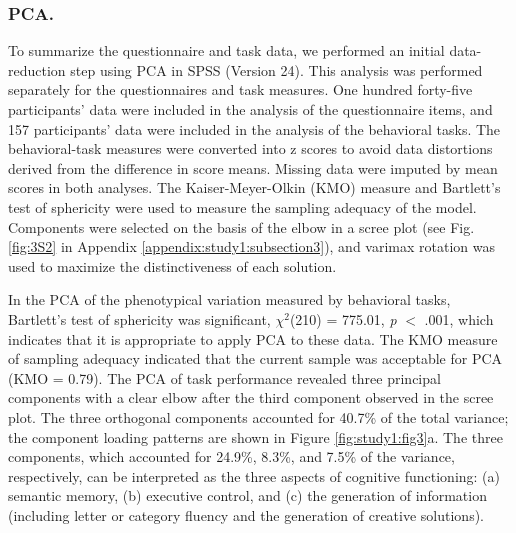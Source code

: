\subsubsection{PCA.} 
To summarize the questionnaire and task data, we performed an initial data-reduction step using PCA in SPSS (Version 24). This analysis was performed separately for the questionnaires and task measures. One hundred forty-five participants’ data were included in the analysis of the questionnaire items, and 157 participants’ data were included in the analysis of the behavioral tasks. The behavioral-task measures were converted into z scores to avoid data distortions derived from the difference in score means. Missing data were imputed by mean scores in both analyses. The Kaiser-Meyer-Olkin (KMO) measure and Bartlett’s test of sphericity were used to measure the sampling adequacy of the model. Components were selected on the basis of the elbow in a scree plot (see Fig.\ref{fig:3S2} in Appendix \ref{appendix:study1:subsection3}), and varimax rotation was used to maximize the distinctiveness of each solution.

In the PCA of the phenotypical variation measured by behavioral tasks, Bartlett’s test of sphericity was significant, 
$\chi^{2}$(210) = 775.01, 
\textit{p} $<$ .001, which indicates that it is appropriate to apply PCA to these data. The KMO measure of sampling adequacy indicated that the current sample was acceptable for PCA (KMO = 0.79). The PCA of task performance revealed three principal components with a clear elbow after the third component observed in the scree plot. The three orthogonal components accounted for 40.7\% of the total variance; the component loading patterns are shown in Figure \ref{fig:study1:fig3}a. The three components, which accounted for 24.9\%, 8.3\%, and 7.5\% of the variance, respectively, can be interpreted as the three aspects of cognitive functioning: (a) semantic memory, (b) executive control, and (c) the generation of information (including letter or category fluency and the generation of creative solutions).

